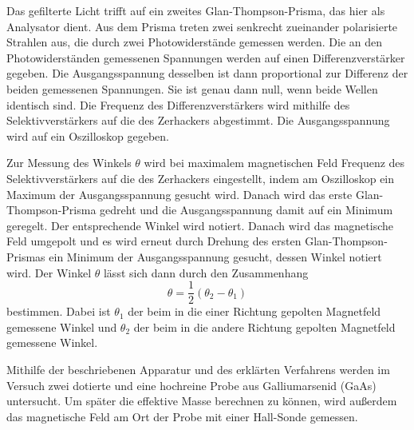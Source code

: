 Das gefilterte Licht trifft auf ein zweites Glan-Thompson-Prisma, das hier als Analysator dient.
Aus dem Prisma treten zwei senkrecht zueinander polarisierte Strahlen aus, die durch zwei
Photowiderstände gemessen werden. Die an den Photowiderständen
gemessenen Spannungen werden auf einen Differenzverstärker gegeben. Die Ausgangsspannung
desselben ist dann proportional zur Differenz der beiden gemessenen Spannungen. Sie
ist genau dann null, wenn beide Wellen identisch sind. Die Frequenz des Differenzverstärkers
wird  mithilfe des Selektivverstärkers auf die des Zerhackers abgestimmt. Die Ausgangsspannung
wird auf ein Oszilloskop gegeben.

Zur Messung des Winkels $\theta$ wird bei maximalem magnetischen Feld Frequenz des Selektivverstärkers
auf die des Zerhackers eingestellt, indem am Oszilloskop ein Maximum der Ausgangsspannung gesucht wird.
Danach wird das erste Glan-Thompson-Prisma
gedreht und die Ausgangsspannung damit auf ein Minimum geregelt. Der entsprechende
Winkel wird notiert. Danach wird das magnetische Feld umgepolt und es wird erneut
durch Drehung des ersten Glan-Thompson-Prismas ein Minimum der Ausgangsspannung gesucht,
dessen Winkel notiert wird. Der Winkel $\theta$ lässt sich dann durch den Zusammenhang
\begin{equation}
  \theta  = \frac{1}{2} (\theta_2 - \theta_1)
\label{eqn:drehwinkel}
\end{equation}
bestimmen. Dabei ist $\theta_1$ der beim in die einer Richtung gepolten Magnetfeld gemessene Winkel und
$\theta_2$ der beim in die andere Richtung gepolten Magnetfeld gemessene Winkel.

Mithilfe der beschriebenen Apparatur und des erklärten Verfahrens werden im Versuch zwei dotierte
und eine hochreine Probe aus Galliumarsenid (GaAs) untersucht. Um später die effektive Masse berechnen zu
können, wird außerdem das magnetische Feld am Ort der Probe mit einer Hall-Sonde gemessen.
